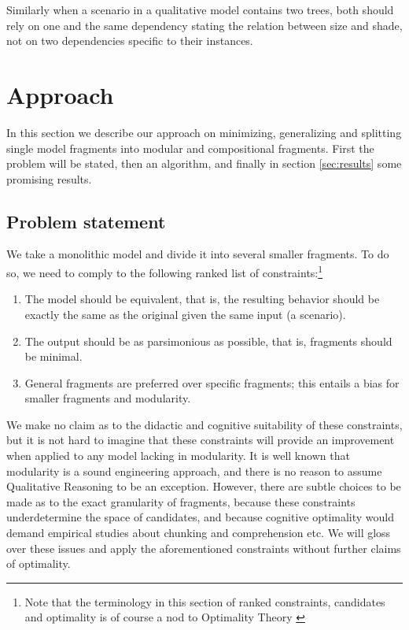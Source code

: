 \documentclass{article} %
\begin{document}
	Similarly when a scenario in a qualitative model contains two trees,
	both should rely on one and the same dependency stating the relation
	between size and shade, not on two dependencies specific to their
	instances. 

\section{Approach}
\label{sec:approach}
In this section we describe our approach on minimizing, generalizing and
splitting single model fragments into modular and compositional fragments.
First the problem will be stated, then an algorithm, and finally in section 
\ref{sec:results} some promising results.

\subsection{Problem statement}

We take a monolithic model and divide it into several smaller fragments. To do
so, we need to comply to the following ranked list of
constraints:\footnote{Note that the terminology in this section of ranked
constraints, candidates and optimality is of course a nod to Optimality
Theory \cite{princesmolensky}}

\begin{enumerate}
\item The model should be equivalent, that is, the resulting behavior should
	be exactly the same as the original given the same input (a scenario).

\item The output should be as parsimonious as possible, that is, fragments
	should be minimal.

\item General fragments are preferred over specific fragments; this entails a
	bias for smaller fragments and modularity.

\end{enumerate}

We make no claim as to the didactic and cognitive suitability of these
constraints, but it is not hard to imagine that these constraints will provide
an improvement when applied to any model lacking in modularity. It is well
known that modularity is a sound engineering approach, and there is no reason
to assume Qualitative Reasoning to be an exception. However, there are subtle
choices to be made as to the exact granularity of fragments, because these
constraints underdetermine the space of candidates, and because cognitive
optimality would demand empirical studies about chunking and comprehension
etc. We will gloss over these issues and apply the aforementioned constraints
without further claims of optimality.
\end{document}
